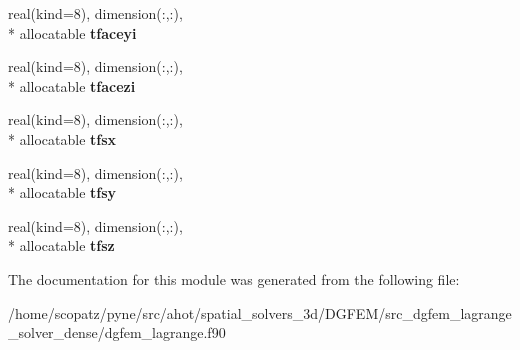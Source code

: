 \begin{DoxyCompactItemize}
\item 
\hypertarget{classdgfem__lagrange_ad9aea6402d5e36164ae41e9526c17825}{real(kind=8), dimension(\-:,\-:), \\*
allocatable {\bfseries tfaceyi}}\label{classdgfem__lagrange_ad9aea6402d5e36164ae41e9526c17825}

\item 
\hypertarget{classdgfem__lagrange_a2aff66b06931f934592c47c07a67f78d}{real(kind=8), dimension(\-:,\-:), \\*
allocatable {\bfseries tfacezi}}\label{classdgfem__lagrange_a2aff66b06931f934592c47c07a67f78d}

\item 
\hypertarget{classdgfem__lagrange_afd3cf4c173e4b04e2038b2e7cb6e9f23}{real(kind=8), dimension(\-:,\-:), \\*
allocatable {\bfseries tfsx}}\label{classdgfem__lagrange_afd3cf4c173e4b04e2038b2e7cb6e9f23}

\item 
\hypertarget{classdgfem__lagrange_a3227176b19511ae90db3ee5b93cd1da2}{real(kind=8), dimension(\-:,\-:), \\*
allocatable {\bfseries tfsy}}\label{classdgfem__lagrange_a3227176b19511ae90db3ee5b93cd1da2}

\item 
\hypertarget{classdgfem__lagrange_ae4bc228f094f616277477f9a733b05ca}{real(kind=8), dimension(\-:,\-:), \\*
allocatable {\bfseries tfsz}}\label{classdgfem__lagrange_ae4bc228f094f616277477f9a733b05ca}

\end{DoxyCompactItemize}


The documentation for this module was generated from the following file\-:\begin{DoxyCompactItemize}
\item 
/home/scopatz/pyne/src/ahot/spatial\-\_\-solvers\-\_\-3d/\-D\-G\-F\-E\-M/src\-\_\-dgfem\-\_\-lagrange\-\_\-solver\-\_\-dense/dgfem\-\_\-lagrange.\-f90\end{DoxyCompactItemize}
